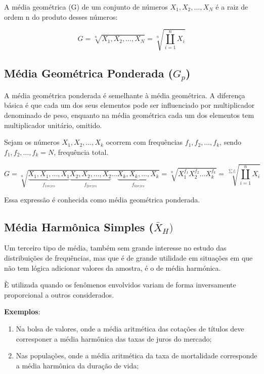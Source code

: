 A média geométrica (G) de um conjunto de números $X_{1},X_{2},\ldots,X_{N}$ é a raiz de ordem n do produto
desses números:

\begin{equation}\label{Geometrica}
    G=\sqrt[n]{X_{1},X_{2},\ldots,X_{N}}=\sqrt[n]{\coprod_{i=1}^{n}X_{i}}
\end{equation}


\subsection{Média Geométrica Ponderada ($G_{p}$)}

A média geométrica ponderada é semelhante à média geométrica. A diferença básica é que cada um dos seus elementos pode ser influenciado por multiplicador denominado de peso, enquanto na média geométrica cada um dos elementos tem multiplicador unitário, omitido.\vskip0.3cm


Sejam os números $X_{1},X_{2},\ldots,X_{k}$ ocorrem com frequências $f_{1},f_{2},\ldots,f_{k}$, sendo $f_{1},f_{2},\ldots,f_{k}=N$, frequência total.


\begin{equation}\label{Geometrica}
    G=\sqrt[n]{\underbrace{X_{1},X_{1},...,X_{1}}_{f_{1vezes}}\underbrace{X_{2},X_{2},...,X_{2}}_{f_{2vezes}} \ldots \underbrace{X_{k},X_{k},...,X_{k}}_{f_{kvezes}}}=\sqrt[n]{X_{1}^{f_{1}}X_{2}^{f_{2}}\ldots X_{k}^{f_{k}}}
 = \sqrt[\sum f_{i}]{\coprod_{i=1}^{n}X_{i}}
\end{equation}

Essa expressão é conhecida como média geométrica ponderada.



\subsection{Média Harmônica Simples ($\bar{X}_{H})$}


\inic Um terceiro tipo de média, também sem grande interesse no estudo das
distribuições de frequências, mas que é de grande utilidade em situações em que não
tem lógica adicionar valores da amostra, é o de média harmónica.\vskip0.3cm



È utilizada quando os fenômenos envolvidos variam de forma inversamente proporcional a outros considerados.\vskip0.3cm

\textbf{Exemplos}:
\begin{enumerate}
  \item Na bolsa de valores, onde a média aritmética das cotações de títulos deve corresponer a média harmônica das taxas de juros do mercado;
  \item Nas populações, onde a média aritmética da taxa de mortalidade corresponde a média harmônica da duração de vida;
\end{enumerate}

